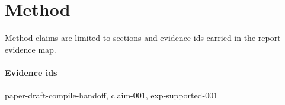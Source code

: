 \section{Method}
Method claims are limited to sections and evidence ids carried in the report evidence map.

\paragraph{Evidence ids} paper-draft-compile-handoff, claim-001, exp-supported-001
